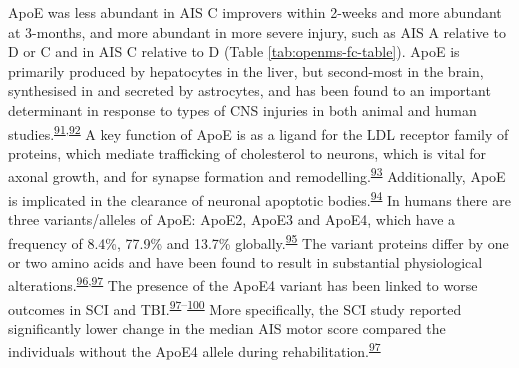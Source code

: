 \documentclass[
]{article}
\begin{document}
ApoE was less abundant in AIS C improvers within 2-weeks and more abundant at 3-months, and more abundant in more severe injury, such as AIS A relative to D or C and in AIS C relative to D (Table \ref{tab:openms-fc-table}).
ApoE is primarily produced by hepatocytes in the liver, but second-most in the brain, synthesised in and secreted by astrocytes, and has been found to an important determinant in response to types of CNS injuries in both animal and human studies.\textsuperscript{\protect\hyperlink{ref-teasdale_association_1997}{91},\protect\hyperlink{ref-poirier_apolipoprotein_1994}{92}}
A key function of ApoE is as a ligand for the LDL receptor family of proteins, which mediate trafficking of cholesterol to neurons, which is vital for axonal growth, and for synapse formation and remodelling.\textsuperscript{\protect\hyperlink{ref-xu_interactions_2014}{93}}
Additionally, ApoE is implicated in the clearance of neuronal apoptotic bodies.\textsuperscript{\protect\hyperlink{ref-elliott_apoptosis_2007}{94}}
In humans there are three variants/alleles of ApoE: ApoE2, ApoE3 and ApoE4, which have a frequency of 8.4\%, 77.9\% and 13.7\% globally.\textsuperscript{\protect\hyperlink{ref-liu_apolipoprotein_2013}{95}}
The variant proteins differ by one or two amino acids and have been found to result in substantial physiological alterations.\textsuperscript{\protect\hyperlink{ref-mahley_apolipoprotein_2000}{96},\protect\hyperlink{ref-jha_apolipoprotein_2008}{97}}
The presence of the ApoE4 variant has been linked to worse outcomes in SCI and TBI.\textsuperscript{\protect\hyperlink{ref-jha_apolipoprotein_2008}{97}--\protect\hyperlink{ref-friedman_apolipoprotein_1999}{100}}
More specifically, the SCI study reported significantly lower change in the median AIS motor score compared the individuals without the ApoE4 allele during rehabilitation.\textsuperscript{\protect\hyperlink{ref-jha_apolipoprotein_2008}{97}}
\end{document}
